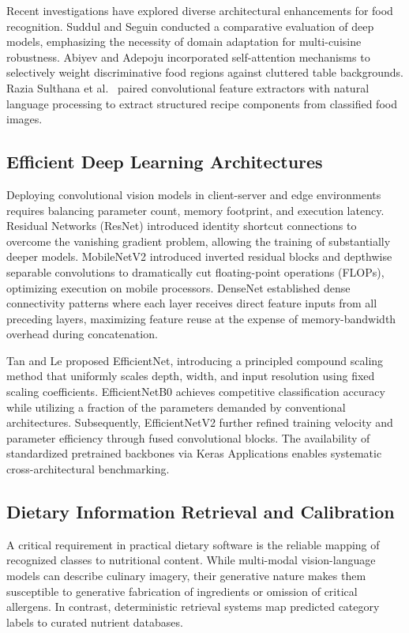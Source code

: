 \documentclass[conference]{IEEEtran}
\begin{document}
Recent investigations have explored diverse architectural enhancements for food recognition. Suddul and Seguin \cite{suddul2023} conducted a comparative evaluation of deep models, emphasizing the necessity of domain adaptation for multi-cuisine robustness. Abiyev and Adepoju \cite{abiyev2024} incorporated self-attention mechanisms to selectively weight discriminative food regions against cluttered table backgrounds. Razia Sulthana et al.~\cite{razia2024} paired convolutional feature extractors with natural language processing to extract structured recipe components from classified food images.

\subsection{Efficient Deep Learning Architectures}
Deploying convolutional vision models in client-server and edge environments requires balancing parameter count, memory footprint, and execution latency. Residual Networks (ResNet) \cite{he2016deep} introduced identity shortcut connections to overcome the vanishing gradient problem, allowing the training of substantially deeper models. MobileNetV2 \cite{sandler2018mobilenetv2} introduced inverted residual blocks and depthwise separable convolutions to dramatically cut floating-point operations (FLOPs), optimizing execution on mobile processors. DenseNet \cite{huang2017densely} established dense connectivity patterns where each layer receives direct feature inputs from all preceding layers, maximizing feature reuse at the expense of memory-bandwidth overhead during concatenation.

Tan and Le \cite{tan2019efficientnet} proposed EfficientNet, introducing a principled compound scaling method that uniformly scales depth, width, and input resolution using fixed scaling coefficients. EfficientNetB0 achieves competitive classification accuracy while utilizing a fraction of the parameters demanded by conventional architectures. Subsequently, EfficientNetV2 \cite{tan2021efficientnetv2} further refined training velocity and parameter efficiency through fused convolutional blocks. The availability of standardized pretrained backbones via Keras Applications \cite{kerasapps} enables systematic cross-architectural benchmarking.

\subsection{Dietary Information Retrieval and Calibration}
A critical requirement in practical dietary software is the reliable mapping of recognized classes to nutritional content. While multi-modal vision-language models can describe culinary imagery, their generative nature makes them susceptible to generative fabrication of ingredients or omission of critical allergens. In contrast, deterministic retrieval systems map predicted category labels to curated nutrient databases.
\end{document}
